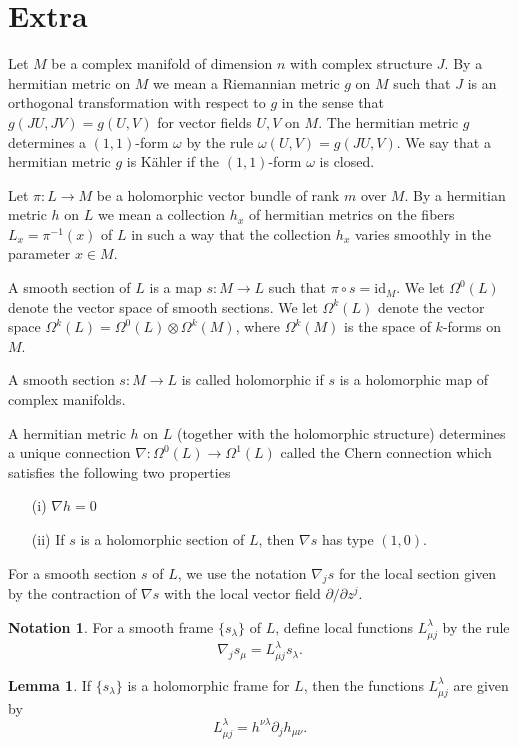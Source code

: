 \documentclass{article}
\numberwithin{equation}{section}
\theoremstyle{definition}
\newtheorem{notation}[definition]{Notation}
\theoremstyle{theorem}
\newtheorem{lemma}[definition]{Lemma}
\begin{document}
\section{Extra}


Let $M$ be a complex manifold of dimension $n$ with complex structure $J$. By a hermitian metric on $M$ we mean a Riemannian metric $g$ on $M$ such that $J$ is an orthogonal transformation with respect to $g$ in the sense that $g(JU, JV) = g(U,V)$ for vector fields $U,V$ on $M$. The hermitian metric $g$ determines a $(1,1)$-form $\omega$ by the rule $\omega(U,V) = g(JU,V)$. We say that a hermitian metric $g$ is K\"ahler if the $(1,1)$-form $\omega$ is closed.  

Let $\pi : L \to M$ be a holomorphic vector bundle of rank $m$ over $M$. By a hermitian metric $h$ on $L$ we mean a collection $h_x$ of hermitian metrics on the fibers $L_x = \pi^{-1}(x)$ of $L$ in such a way that the collection $h_x$ varies smoothly in the parameter $x \in M$.

A smooth section of $L$ is a map $s : M \to L$ such that $\pi \circ s = \text{id}_M$. We let $\Omega^0(L)$ denote the vector space of smooth sections. We let $\Omega^k(L)$ denote the vector space $\Omega^k(L) = \Omega^0(L) \otimes \Omega^k(M)$, where $\Omega^k(M)$ is the space of $k$-forms on $M$. 

A smooth section $s : M \to L$ is called holomorphic if $s$ is a holomorphic map of complex manifolds.  

A hermitian metric $h$ on $L$ (together with the holomorphic structure) determines a unique connection $\nabla : \Omega^0(L) \to \Omega^1(L)$ called the Chern connection which satisfies the following two properties
\begin{enumerate}
\item[(i)] $\nabla h = 0$
\item[(ii)] If $s$ is a holomorphic section of $L$, then $\nabla s$ has type $(1,0)$. 
\end{enumerate}
For a smooth section $s$ of $L$, we use the notation $\nabla_j s$ for the local section given by the contraction of $\nabla s$ with the local vector field $\partial/\partial z^j$. 

\begin{notation}
For a smooth frame $\{s_\lambda\}$ of $L$, define local functions $L^{\lambda}_{\mu j}$ by the rule 
\[
\nabla_j s_\mu = L^{\lambda}_{\mu j} s_\lambda .
\]
\end{notation}

\begin{lemma}
If $\{s_\lambda\}$ is a holomorphic frame for $L$, then the functions $L^{\lambda}_{\mu j}$ are given by 
\[
L^{\lambda}_{\mu j} =  h^{\nu \lambda}\partial_j h_{\mu \nu}. 
\]
\end{lemma}
\end{document}
